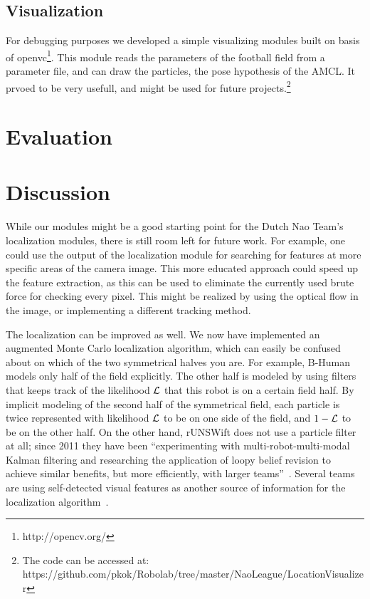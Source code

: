 \documentclass[	DIV=calc,%
							paper=a4,%
							fontsize=9pt,%
							twocolumn]{scrartcl}	 					%
\begin{document}
\subsection{Visualization}
For debugging purposes we developed a simple visualizing modules built on basis of openvc\footnote{http://opencv.org/}. This module reads the parameters of the football field from a parameter file, and can draw the particles, the pose hypothesis of the AMCL. It prvoed to be very usefull, and might be used for future projects.\footnote{The code can be accessed at: https://github.com/pkok/Robolab/tree/master/NaoLeague/LocationVisualizer}

\section{Evaluation}
\label{sec:Evaluation}

\section{Discussion}
\label{sec:Discussion}
While our modules might be a good starting point for the Dutch Nao Team's localization modules, there is still room left for future work.  For example, one could use the output of the localization module for searching for features at more specific areas of the camera image.  This more educated approach could speed up the feature extraction, as this can be used to eliminate the currently used brute force for checking every pixel.  This might be realized by using the optical flow in the image, or implementing a different tracking method.

The localization can be improved as well.  We now have implemented an augmented Monte Carlo localization algorithm, which can easily be confused about on which of the two symmetrical halves you are.  For example, B-Human~\cite{TeamReportB-Human} models only half of the field explicitly.  The other half is modeled by using filters that keeps track of the likelihood ${\cal L}$ that this robot is on a certain field half.  By implicit modeling of the second half of the symmetrical field, each particle is twice represented with likelihood ${\cal L}$ to be on one side of the field, and $1 - {\cal L}$ to be on the other half.  On the other hand, rUNSWift does not use a particle filter at all; since 2011 they have been ``experimenting with multi-robot-multi-modal Kalman filtering and researching the application of loopy belief revision to achieve similar benefits, but more efficiently, with larger teams''~\cite{rUNSWift-TD-11}.  Several teams are using self-detected visual features as another source of information for the localization algorithm~\cite{sturm2006msc,Cuauhpipiltin-TD12}.
\end{document}
